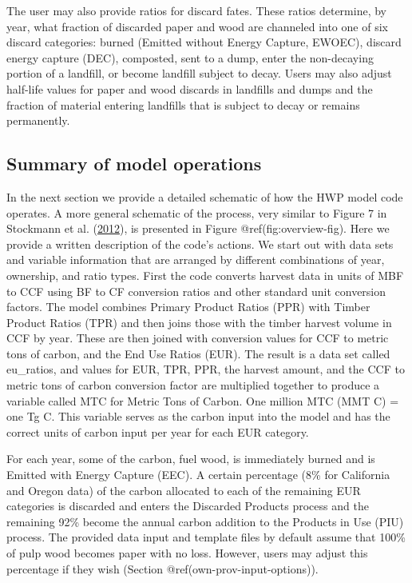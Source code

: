 \documentclass[
  openany]{book}
\begin{document}
The user may also provide ratios for discard fates. These ratios
determine, by year, what fraction of discarded paper and wood are
channeled into one of six discard categories: burned (Emitted without
Energy Capture, EWOEC), discard energy capture (DEC), composted, sent to
a dump, enter the non-decaying portion of a landfill, or become landfill
subject to decay. Users may also adjust half-life values for paper and
wood discards in landfills and dumps and the fraction of material
entering landfills that is subject to decay or remains permanently.

\hypertarget{model-func-opp}{%
\subsection{Summary of model operations}\label{model-func-opp}}

In the next section we provide a detailed schematic of how the HWP model
code operates. A more general schematic of the process, very similar to
Figure 7 in Stockmann et al.
(\protect\hyperlink{ref-stockmann2012}{2012}), is presented in Figure
@ref(fig:overview-fig). Here we provide a written description of the
code's actions. We start out with data sets and variable information
that are arranged by different combinations of year, ownership, and
ratio types. First the code converts harvest data in units of MBF to CCF
using BF to CF conversion ratios and other standard unit conversion
factors. The model combines Primary Product Ratios (PPR) with Timber
Product Ratios (TPR) and then joins those with the timber harvest volume
in CCF by year. These are then joined with conversion values for CCF to
metric tons of carbon, and the End Use Ratios (EUR). The result is a
data set called eu\_ratios, and values for EUR, TPR, PPR, the harvest
amount, and the CCF to metric tons of carbon conversion factor are
multiplied together to produce a variable called MTC for Metric Tons of
Carbon. One million MTC (MMT C) = one Tg C. This variable serves as the
carbon input into the model and has the correct units of carbon input
per year for each EUR category.

For each year, some of the carbon, fuel wood, is immediately burned and
is Emitted with Energy Capture (EEC). A certain percentage (8\% for
California and Oregon data) of the carbon allocated to each of the
remaining EUR categories is discarded and enters the Discarded Products
process and the remaining 92\% become the annual carbon addition to the
Products in Use (PIU) process. The provided data input and template
files by default assume that 100\% of pulp wood becomes paper with no
loss. However, users may adjust this percentage if they wish (Section
@ref(own-prov-input-options)).
\end{document}
